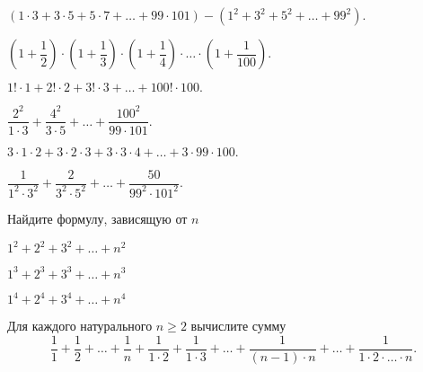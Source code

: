\documentclass{article}
\begin{document}
    \begin{enumerate_boxed}

        \setcounter{enumi}{0}

        \item $(1\cdot 3+3\cdot 5+5\cdot 7+\dotsc+99\cdot 101) - (1^2+3^2+5^2+ \dotsc +99^2).$
        \item $\left(1+ \dfrac{1}{2}\right) \cdot  \left(1+ \dfrac{1}{3}\right) \cdot  \left(1+ \dfrac{1}{4}\right) \cdot  \dotsc \cdot  \left(1+ \dfrac{1}{100}\right).$

        \item $1!\cdot 1 + 2!\cdot 2 + 3!\cdot 3 + \dotsc +100!\cdot 100.$

        \item $\dfrac{2^2}{1 \cdot 3} + \dfrac{4^2}{3 \cdot 5} + \dotsc +  \dfrac{100^2}{99 \cdot 101}.$

        \item $3\cdot 1\cdot 2 + 3\cdot 2\cdot 3 + 3\cdot 3\cdot 4 + \dotsc +3\cdot 99\cdot 100.$

        \item $\dfrac{1}{1^2 \cdot 3^2} + \dfrac{2}{3^2 \cdot 5^2} + \dotsc +  \dfrac{50}{99^2 \cdot 101^2}.$

        Найдите формулу, зависящую от $n$

        \item $1^2 + 2^2 + 3^2 + \dotsc +n^2$

        \item $1^3 + 2^3 + 3^3 + \dotsc +n^3$

        \item $1^4 + 2^4 + 3^4 + \dotsc +n^4$

        \item Для каждого натурального $n \ge 2$ вычислите сумму
        \[\dfrac{1}{1} + \dfrac{1}{2} + \dotso +  \dfrac{1}{n} + \dfrac{1}{1 \cdot 2} + \dfrac{1}{1 \cdot 3} + \dotso + \dfrac{1}{(n-1) \cdot n} + \dotso + \dfrac{1}{1 \cdot 2 \cdot \dotso \cdot n}.\]

    \end{enumerate_boxed}
\end{document}
